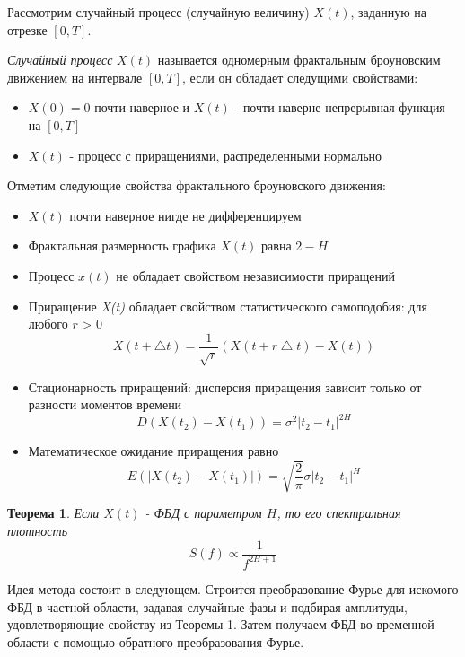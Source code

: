 Рассмотрим случайный процесс (случайную величину) $X(t)$, заданную на отрезке $[0, T]$.

\textit{Случайный процесс}  $X(t)$ называется одномерным фрактальным броуновским движением на интервале $[0, T]$, если он обладает следущими свойствами:

\begin{itemize}
	\item $X(0) = 0$ почти наверное и $X(t)$ - почти наверне непрерывная функция на $[0, T]$
	\item  $X(t)$ - процесс с приращениями, распределенными нормально
\end{itemize}

Отметим следующие свойства фрактального броуновского движения:

\begin{itemize}
	\item $X(t)$ почти наверное нигде не дифференцируем 
	\item Фрактальная размерность графика $X(t)$ равна $2 - H$
	\item Процесс $x(t)$ не обладает свойством независимости приращений
	\item Приращение \textit{X(t)} обладает свойством статистического самоподобия: для любого $r$ > 0
	\begin{equation}
		X(t+ \bigtriangleup t) = \frac{1}{\sqrt{r}}(X(t+r\bigtriangleup t) - X(t))
	\end{equation}
	\item Стационарность приращений: дисперсия приращения зависит только от разности моментов времени
	\begin{equation} \label{1.6}
		D(X(t_2) - X(t_1)) = \sigma^2|t_2-t_1|^{2H}
	\end{equation}
	\item Математическое ожидание приращения равно
	\begin{equation}
		E(|X(t_2) - X(t_1)|) = \sqrt{\frac{2}{\pi}}\sigma|t_2-t_1|^H
	\end{equation}
\end{itemize}

\newtheorem{theorem1}{Теорема}
\begin{theorem1}
	Если $X(t)$ - ФБД с параметром $H$, то его спектральная плотность 
	\begin{equation}
		S(f) \propto \frac{1}{f^{2H+1}}
	\end{equation}
\end{theorem1}

Идея метода состоит в следующем. Строится преобразование Фурье для искомого ФБД в частной области, задавая случайные фазы и подбирая амплитуды, удовлетворяющие свойству из Теоремы 1. Затем получаем ФБД во временной области с помощью обратного преобразования Фурье.

